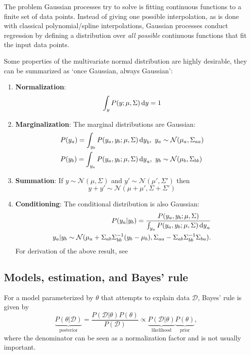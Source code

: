 \documentclass{article}
\begin{document}
The problem Gaussian processes try to solve is fitting continuous functions to a finite set of data points. Instead of giving one possible interpolation, as is done with classical polynomial/spline interpolations, Gaussian processes conduct regression by defining a distribution over \textit{all possible} continuous functions that fit the input data points.

Some properties of the multivariate normal distribution are highly desirable, they can be summarized as `once Gaussian, always Gaussian':
\begin{enumerate}
    \item \textbf{Normalization}:
    \begin{equation}
        \int_y P(y;\mu,\Sigma)\dl y=1
    \end{equation}
    \item \textbf{Marginalization}: The marginal distributions are Gaussian:
    \begin{align}
        &P(y_a)=\int_{y_b}P(y_a,y_b;\mu,\Sigma)\dl y_b,\ y_a\sim\mathcal{N}(\mu_a,\Sigma_{aa})\\
        &P(y_b)=\int_{y_a}P(y_a,y_b;\mu,\Sigma)\dl y_a,\ y_b\sim\mathcal{N}(\mu_b,\Sigma_{bb})
    \end{align}
    \item \textbf{Summation}: If $y\sim\mathcal{N}(\mu,\Sigma)$ and $y'\sim\mathcal{N}(\mu',\Sigma')$ then
    \begin{equation}
        y+y'\sim\mathcal{N}(\mu+\mu',\Sigma+\Sigma')
    \end{equation}
    \item \textbf{Conditioning}: The conditional distribution is also Gaussian:
    \begin{align}
        P(y_a|y_b)=\frac{P(y_a,y_b;\mu,\Sigma)}{\int_{y_a}P(y_a,y_b;\mu,\Sigma)\dl y_a}\\
        y_a|y_b\sim\mathcal{N}(\mu_a+\Sigma_{ab}\Sigma_{bb}^{-1}(y_b-\mu_b),\Sigma_{aa}-\Sigma_{ab}\Sigma_{bb}^{-1}\Sigma_{ba}).
    \end{align}
    For derivation of the above result, see \cite[Ch. 2.3.1]{bishopPatternRecognitionMachine2006}
\end{enumerate}

\subsection{Models, estimation, and Bayes' rule}
For a model parameterized by $\theta$ that attempts to explain data $\mathcal{D}$, Bayes' rule is given by
\begin{equation}
\underbrace{P(\theta|\mathcal{D})}_{\mathrm{posterior}}=\frac{P(\mathcal{D}|\theta)P(\theta)}{P(\mathcal{D})}\propto \underbrace{P(\mathcal{D}|\theta)}_{\mathrm{likelihood}}\underbrace{P(\theta)}_{\mathrm{prior}},
\end{equation}
where the denominator can be seen as a normalization factor and is not usually important.
\end{document}
